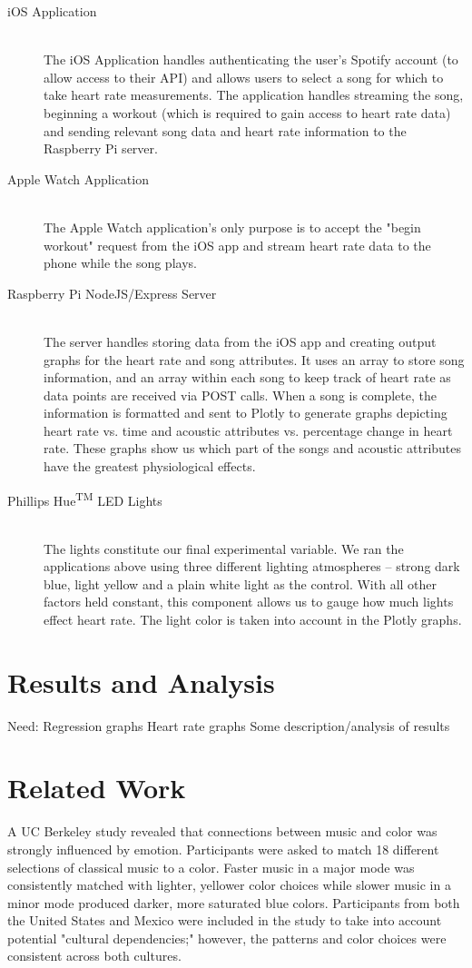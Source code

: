\documentclass[11pt]{article}
\begin{document}
\begin{description}
 	\item[iOS Application] \hfill \\
The iOS Application handles authenticating the user's Spotify account (to allow access to their API) and allows users to select a song for which to take heart rate measurements. The application handles streaming the song, beginning a workout (which is required to gain access to heart rate data) and sending relevant song data and heart rate information to the Raspberry Pi server.
	\item[Apple Watch Application] \hfill \\
The Apple Watch application's only purpose is to accept the "begin workout" request from the iOS app and stream heart rate data to the phone while the song plays.
	\item[Raspberry Pi NodeJS/Express Server] \hfill \\
The server handles storing data from the iOS app and creating output graphs for the heart rate and song attributes. It uses an array to store song information, and an array within each song to keep track of heart rate as data points are received via POST calls. When a song is complete, the information is formatted and sent to Plotly to generate graphs depicting heart rate vs. time and acoustic attributes vs. percentage change in heart rate. These graphs show us which part of the songs and acoustic attributes have the greatest physiological effects.
	\item[Phillips Hue\textsuperscript{TM} LED Lights] \hfill \\
The lights constitute our final experimental variable. We ran the applications above using three different lighting atmospheres -- strong dark blue, light yellow and a plain white light as the control. With all other factors held constant, this component allows us to gauge how much lights effect heart rate. The light color is taken into account in the Plotly graphs.  
\end{description}


\section{Results and Analysis}
Need:
Regression graphs
Heart rate graphs
Some description/analysis of results 

\section{Related Work}
A UC Berkeley study revealed that connections between music and color was strongly influenced by emotion. \cite{Palmer} Participants were asked to match 18 different selections of classical music to a color. Faster music in a major mode was consistently matched with lighter, yellower color choices while slower music in a minor mode produced darker, more saturated blue colors. Participants from both the United States and Mexico were included in the study to take into account potential "cultural dependencies;" however, the patterns and color choices were consistent across both cultures.
\end{document}
